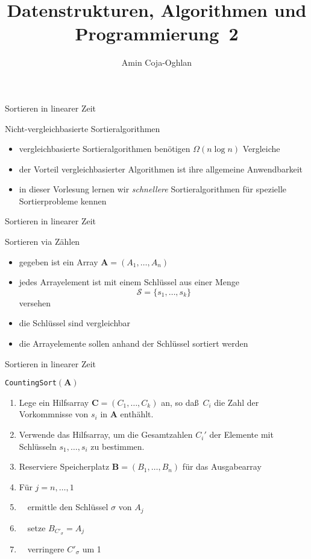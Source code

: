 \documentclass[aspectratio=1610, 11pt]{beamer}
\title{Datenstrukturen, Algorithmen und Programmierung~2}
\author[A.~Coja-Oghlan]{Amin Coja-Oghlan}
\institute[DAP2]{Lehrstuhl Informatik 2\\Fakult\"at f\"ur Informatik}
\renewcommand{\vec}[1]{\boldsymbol{#1}}
\newcommand\cS{\mathcal S}
\newcommand\vA{\vec A}
\newcommand\vB{\vec B}
\newcommand\vC{\vec C}
\begin{document}
\maketitle

\begin{frame}{Sortieren in linearer Zeit}
	\begin{exampleblock}{Nicht-vergleichbasierte Sortieralgorithmen}
		\begin{itemize}
			\item vergleichbasierte Sortieralgorithmen ben\"otigen $\Omega(n\log n)$ Vergleiche
			\item der Vorteil vergleichbasierter Algorithmen ist ihre allgemeine Anwendbarkeit
			\item in dieser Vorlesung lernen wir \emph{schnellere} Sortieralgorithmen f\"ur spezielle Sortierprobleme kennen
		\end{itemize}
	\end{exampleblock}
\end{frame}

\begin{frame}{Sortieren in linearer Zeit}
	\begin{exampleblock}{Sortieren via Z\"ahlen}
		\begin{itemize}
			\item gegeben ist ein Array $\vA=(A_1,\ldots,A_n)$
			\item jedes Arrayelement ist mit einem \alert{Schl\"ussel} aus einer Menge
				$$\cS=\{s_1,\ldots,s_k\}$$
				versehen
			\item die Schl\"ussel sind vergleichbar
			\item die Arrayelemente sollen anhand der Schl\"ussel sortiert werden
		\end{itemize}
	\end{exampleblock}
\end{frame}

\begin{frame}{Sortieren in linearer Zeit}
	\begin{exampleblock}{{\tt CountingSort}$(\vA)$}
		\begin{enumerate}
			\item Lege ein Hilfsarray $\vC=(C_1,\ldots,C_k)$ an, so da\ss\ $C_i$ die Zahl der Vorkommnisse von $s_i$ in $\vA$ enth\"ahlt.
			\item Verwende das Hilfsarray, um die Gesamtzahlen $C_i'$ der Elemente mit Schl\"usseln $s_1,\ldots,s_i$ zu bestimmen.
			\item Reserviere Speicherplatz $\vB=(B_1,\ldots,B_n)$ f\"ur das Ausgabearray
			\item F\"ur $j=n,\ldots,1$
			\item $\quad$ermittle den Schl\"ussel $\sigma$ von $A_j$
			\item $\quad$setze $B_{C'_\sigma}=A_j$
			\item $\quad$verringere $C'_\sigma$ um 1
		\end{enumerate}
	\end{exampleblock}
\end{frame}
\end{document}
